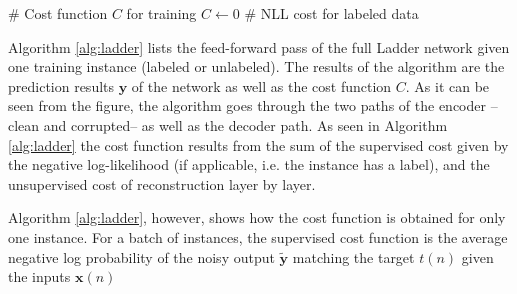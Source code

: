 \begin{algorithm}[ht]
\begin{multicols}{2}
\begin{algorithmic}
      \ELSE
      \ENDIF
    \ENDFOR
    \STATE \# Cost function $C$ for training
    \STATE $C \leftarrow 0$
      \STATE \# NLL cost for labeled data
    \ENDIF
  \end{algorithmic}
  \end{multicols}
\end{algorithm}

Algorithm \ref{alg:ladder} lists the feed-forward pass of the full Ladder
network given one training instance (labeled or unlabeled). The results of the
algorithm are the prediction results $\mathbf{y}$ of the network as well as the
cost function $C$. As it can be seen from the figure, the algorithm goes
through the two paths of the encoder --clean and corrupted-- as well as the
decoder path. As seen in Algorithm \ref{alg:ladder} the cost function results
from the sum of the supervised cost given by the negative log-likelihood (if
applicable, i.e. the instance has a label), and the unsupervised cost of
reconstruction layer by layer. 

Algorithm \ref{alg:ladder}, however, shows how the cost function is obtained
for only one instance. For a batch of instances, the supervised cost function
is the average negative log probability of the noisy output
$\mathbf{\tilde{y}}$ matching the target $t(n)$ given the inputs
$\mathbf{x}(n)$

